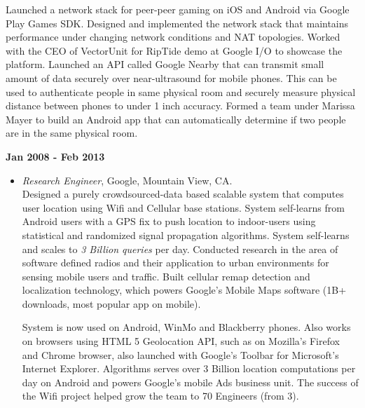 \begin{resume}
\begin{itemize}
             Launched a network stack for peer-peer gaming on iOS and Android via Google Play Games SDK. Designed and
             implemented the network stack that maintains performance under changing network conditions and NAT
             topologies. Worked with the CEO of VectorUnit for RipTide demo at Google I/O to showcase the platform.
             Launched an API called Google Nearby that can transmit small amount of data securely over near-ultrasound
             for mobile phones. This can be used to authenticate people in same physical room and securely measure physical distance
             between phones to under 1 inch accuracy.
             Formed a team under Marissa Mayer to build an Android app that can automatically determine if two people
             are in the same physical room.
    \end{itemize}

{\bf Jan 2008 - Feb 2013}
    \begin{itemize}
         \item[] {\it Research Engineer}, Google, Mountain View, CA.\\

             Designed a purely crowdsourced-data based scalable system that computes user location using Wifi and Cellular base
             stations. System self-learns from Android users with a GPS fix to push location to indoor-users using
             statistical and randomized signal propagation algorithms.  System self-learns and scales to {\em 3 Billion
             queries} per day.
	 Conducted research in the area of software defined radios and
	 their application to urban environments for sensing mobile users and
	 traffic. Built cellular remap detection and localization technology, which
	 powers Google's Mobile Maps software (1B+ downloads, most popular
	 app on mobile).
	 
	 System is now used on Android, WinMo and Blackberry phones. Also works on browsers using HTML 5 Geolocation API, such
	 as on Mozilla's Firefox and Chrome browser, also launched with Google's Toolbar for Microsoft's Internet Explorer.
            Algorithms serves over 3 Billion location computations per day on Android and powers Google's mobile Ads
            business unit. The success of the Wifi project helped grow the team to 70 Engineers (from 3).

    \end{itemize}


\end{resume}
